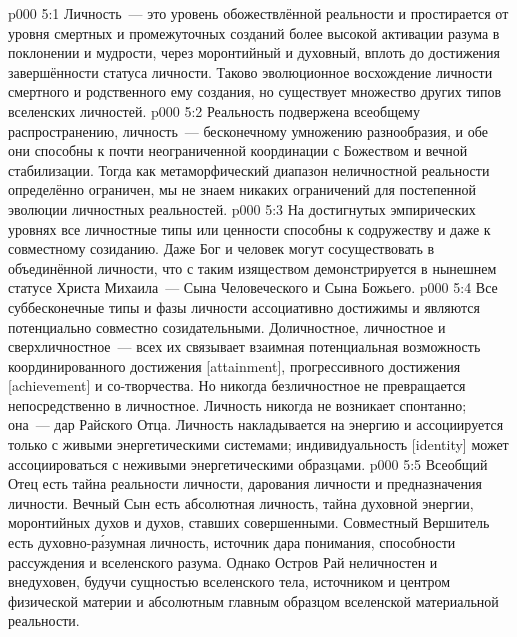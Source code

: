\vs p000 5:1 Личность~--- это уровень обожествлённой реальности и простирается от уровня смертных и промежуточных созданий более высокой активации разума в поклонении и мудрости, через моронтийный и духовный, вплоть до достижения завершённости статуса личности. Таково эволюционное восхождение личности смертного и родственного ему создания, но существует множество других типов вселенских личностей.
\vs p000 5:2 Реальность подвержена всеобщему распространению, личность~--- бесконечному умножению разнообразия, и обе они способны к почти неограниченной координации с Божеством и вечной стабилизации. Тогда как метаморфический диапазон неличностной реальности определённо ограничен, мы не знаем никаких ограничений для постепенной эволюции личностных реальностей.
\vs p000 5:3 На достигнутых эмпирических уровнях все личностные типы или ценности способны к содружеству и даже к совместному созиданию. Даже Бог и человек могут сосуществовать в объединённой личности, что с таким изяществом демонстрируется в нынешнем статусе Христа Михаила~--- Сына Человеческого и Сына Божьего.
\vs p000 5:4 Все суббесконечные типы и фазы личности ассоциативно достижимы и являются потенциально совместно созидательными. Доличностное, личностное и сверхличностное~--- всех их связывает взаимная потенциальная возможность координированного достижения [attainment], прогрессивного достижения [achievement] и со\hyp{}творчества. Но никогда безличностное не превращается непосредственно в личностное. Личность никогда не возникает спонтанно; она~--- дар Райского Отца. Личность накладывается на энергию и ассоциируется только с живыми энергетическими системами; индивидуальность [identity] может ассоциироваться с неживыми энергетическими образцами.
\vs p000 5:5 \pc Всеобщий Отец есть тайна реальности личности, дарования личности и предназначения личности. Вечный Сын есть абсолютная личность, тайна духовной энергии, моронтийных духов и духов, ставших совершенными. Совместный Вершитель есть духовно\hyp{}р\'азумная личность, источник дара понимания, способности рассуждения и вселенского разума. Однако Остров Рай неличностен и внедуховен, будучи сущностью вселенского тела, источником и центром физической материи и абсолютным главным образцом вселенской материальной реальности.

